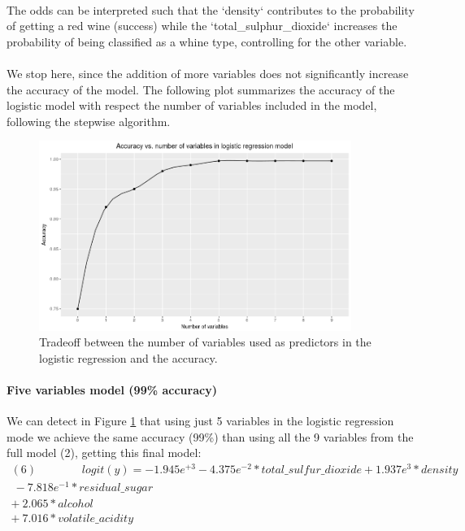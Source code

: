 \documentclass[10pt]{article}
\begin{document}
\paragraph*{}
The odds can be interpreted such that the `density` contributes to the probability of getting a red wine (success) while the `total\_sulphur\_dioxide` increases the probability of being classified as a whine type, controlling for the other variable.

\paragraph*{}
We stop here, since the addition of more variables does not significantly increase the accuracy of the model. The following plot summarizes the accuracy of the logistic model with respect the number of variables included in the model, following the stepwise algorithm.


\begin{figure}[H]
	\centering
	\includegraphics[width=4in]{figures/accuracy-model.png} 
	\caption{Tradeoff between the number of variables used as predictors in the logistic regression and the accuracy.}
	\label{figure:accuracy-model}
\end{figure}

\paragraph{Five variables model (99\% accuracy)}
We can detect in Figure \ref{figure:accuracy-model} that using just 5 variables in the logistic regression mode we achieve the same accuracy (99\%) than using all the 9 variables from the full model (2), getting this final model:
\begin{equation*}
\begin{aligned}	
(6) \ \ \ \ \ \ \ \ \ \ \ \ \ \ \ \ \  \   logit(\hat{y}) = -1.945e^{+3}  -4.375e^{-2}*total\_sulfur\_dioxide + 1.937e^{3}*density \\ \  -7.818e^{-1}*residual\_sugar \\  + \ 2.065*alcohol \\ + \ 7.016*volatile\_acidity
\end{aligned}
\end{equation*}	
\end{document}
